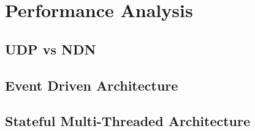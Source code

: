\documentclass{sig-alternate}
\renewcommand\_{\textunderscore\allowbreak}  %
\begin{document}
%


\section{Performance Analysis}

\subsection{UDP vs NDN}

\subsection{Event Driven Architecture}

\subsection{Stateful Multi-Threaded Architecture}
\end{document}
